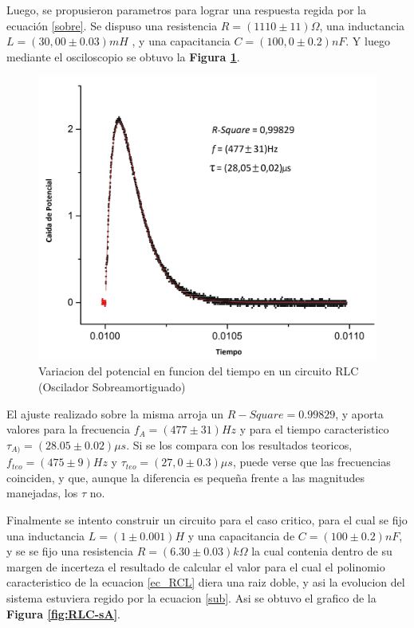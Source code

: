\documentclass[11pt,a4paper]{article}
\begin{document}
Luego, se propusieron parametros para lograr una respuesta regida por la ecuación \eqref{sobre}. Se dispuso una resistencia $R= (1110 \pm 11)\Omega$, una inductancia $L = (30,00 \pm 0.03) mH$ , y una capacitancia $C = (100,0 \pm 0.2) nF$. Y luego mediante el osciloscopio se obtuvo la \textbf{Figura \ref{fig:RLC-SA}}.

\begin{figure}[H]
\centering
\includegraphics[scale=0.45]{RLC-SobreAmortiguado}
  \caption{Variacion del potencial en funcion del tiempo en un circuito RLC (Oscilador Sobreamortiguado)}
  \label{fig:RLC-SA}
\end{figure}

El ajuste realizado sobre la misma arroja un $R-Square = 0.99829$, y aporta valores para la frecuencia \textbf{$f_{A} = (477 \pm 31)Hz$} y para el tiempo caracteristico \textbf{$\tau_{A)} = (28.05 \pm 0.02) \mu s$}. Si se los compara con los resultados teoricos, \textbf{$f_{teo} = (475 \pm 9)Hz$} y \textbf{$\tau_{teo} = (27,0 \pm 0.3) \mu s$}, puede verse que las frecuencias coinciden, y que, aunque la diferencia es pequeña frente a las magnitudes manejadas, los $\tau$ no.

Finalmente se intento construir un circuito para el caso critico, para el cual se fijo una inductancia $L= (1 \pm 0.001) H$ y una capacitancia de  $C = (100 \pm 0.2) nF$, y se se fijo una resistencia $R = (6.30 \pm 0.03) k\Omega$ la cual contenia dentro de su margen de incerteza el resultado de calcular el valor para el cual el polinomio caracteristico de la ecuacion \eqref{ec_RCL} diera una raiz doble, y asi la evolucion del sistema estuviera regido por la ecuacion \eqref{sub}. Asi se obtuvo el grafico de la \textbf{Figura \ref{fig:RLC-sA}}.
\end{document}
